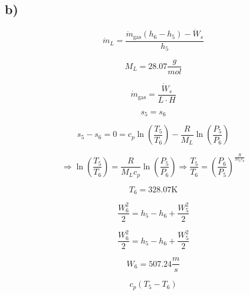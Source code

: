 

\subsection*{b)}

\[
\dot{m}_L = \frac{\dot{m}_{\text{gas}} (h_6 - h_5) - \dot{W}_s}{h_5}
\]

\[
M_L = 28.07 \frac{g}{mol}
\]

\[
\dot{m}_{\text{gas}} = \frac{\dot{W}_s}{L \cdot H}
\]

\[
s_5 = s_6
\]

\[
s_5 - s_6 = 0 = c_p \ln \left( \frac{T_5}{T_6} \right) - \frac{R}{M_L} \ln \left( \frac{P_5}{P_6} \right)
\]

\[
\Rightarrow \ln \left( \frac{T_5}{T_6} \right) = \frac{R}{M_L c_p} \ln \left( \frac{P_5}{P_6} \right) \Rightarrow \frac{T_5}{T_6} = \left( \frac{P_6}{P_5} \right)^{\frac{R}{M_L c_p}}
\]

\[
T_6 = 328.07 \text{K}
\]

\[
\frac{W_6^2}{2} = h_5 - h_6 + \frac{W_5^2}{2}
\]

\[
\frac{W_6^2}{2} = h_5 - h_6 + \frac{W_5^2}{2}
\]

\[
W_6 = 507.24 \frac{m}{s}
\]

\[
c_p (T_5 - T_6)
\]